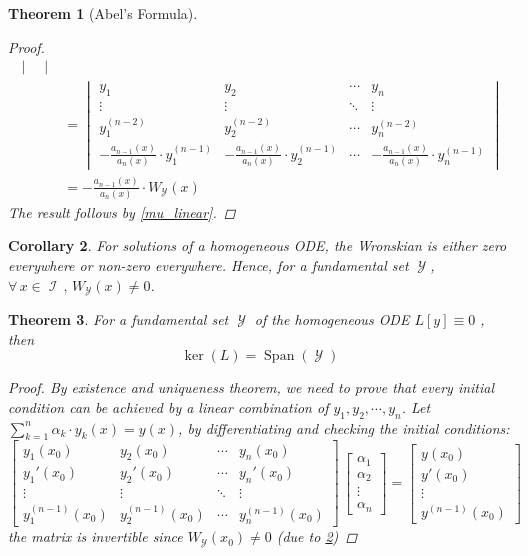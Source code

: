 \documentclass[12pt]{article}
\newcommand{\Forall}[1]{\forall\,{#1}\,,\,}
\DeclareMathOperator{\I}{\mathcal{I}}
\DeclareMathOperator{\Y}{\mathcal{Y}}
\newcommand{\der}[2][n]{{#2}^{(#1)}}
\newtheorem{theorem}{Theorem}[subsection]
\newtheorem{corollary}[theorem]{Corollary}
\begin{document}
\begin{theorem}[Abel's Formula]
\begin{proof}
\begin{align*}
\begin{vmatrix}
      \end{vmatrix}\\
      &=\begin{vmatrix}
        y_1&y_2&\cdots&y_n\\
        \vdots&\vdots&\ddots&\vdots\\
        \der[n-2]{y}_1&\der[n-2]{y}_2&\cdots&\der[n-2]{y}_n\\
        -\frac{a_{n-1}(x)}{a_n(x)}\cdot\der[n-1]{y}_1&-\frac{a_{n-1}(x)}{a_n(x)}\cdot\der[n-1]{y}_2&\cdots&-\frac{a_{n-1}(x)}{a_n(x)}\cdot\der[n-1]{y}_n
      \end{vmatrix}\\
      &=-\frac{a_{n-1}(x)}{a_n(x)}\cdot W_{\Y}(x)
    \end{align*}
    The result follows by \ref{mu_linear}.
  \end{proof}
\end{theorem}

\begin{corollary}
  \label{non_zero_wronsk}
  For solutions of a homogeneous ODE, the Wronskian is either zero everywhere or non-zero everywhere. Hence, for a fundamental set $\Y$, $\Forall{x\in\I}W_{\Y}(x)\neq 0$.
\end{corollary}

\begin{theorem}
  \label{spanning_fundamental}
  For a fundamental set $\Y$ of the homogeneous ODE $L[y]\equiv 0$ , then $$\ker(L)=\operatorname{Span}(\Y)$$
  \begin{proof}
    By existence and uniqueness theorem, we need to prove that every initial condition can be achieved by a linear combination of $y_1,y_2,\cdots,y_n$. Let $\sum_{k=1}^n \alpha_k\cdot y_k(x)=y(x)$, by differentiating and checking the initial conditions:
    $$\begin{bmatrix}
      y_1(x_0)&y_2(x_0)&\cdots&y_n(x_0)\\
      y_1'(x_0)&y_2'(x_0)&\cdots&y_n'(x_0)\\
      \vdots&\vdots&\ddots&\vdots\\
      \der[n-1]{y}_1(x_0)&\der[n-1]{y}_2(x_0)&\cdots&\der[n-1]{y}_n(x_0)
    \end{bmatrix}\,\begin{bmatrix}
      \alpha_1\\\alpha_2\\\vdots\\\alpha_n
    \end{bmatrix}=\begin{bmatrix}
      y(x_0)\\y'(x_0)\\\vdots\\\der[n-1]{y}(x_0)
    \end{bmatrix}$$ the matrix is invertible since $W_{\Y}(x_0)\neq 0$ (due to \ref{non_zero_wronsk})
  \end{proof}
\end{theorem}
\end{document}
